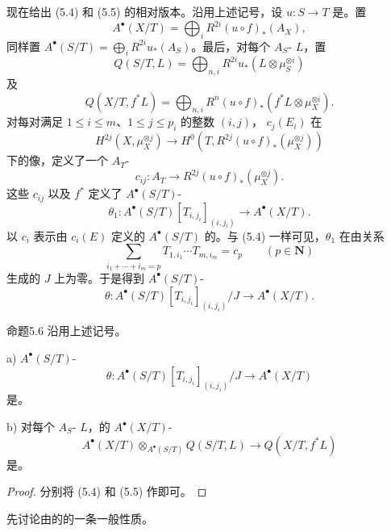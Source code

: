 现在给出 (5.4) 和 (5.5) 的相对版本。沿用上述记号，设 $u:S\to T$ 是。置
\[
 A^\bullet(X/T)=\bigoplus_iR^{2i}(u\circ f)_*(A_X),
\]
同样置 $A^\bullet(S/T)=\bigoplus_iR^{2i}u_*(A_S)$。最后，对每个 $A_S$- $L$，置
\[
 Q(S/T,L)=\bigoplus_{n,i}R^{2i}u_*(L\otimes\mu_S^{\otimes i})
\]
及
\[
 Q(X/T,f^*L)=\bigoplus_{n,i}R^n(u\circ f)_*(f^*L\otimes\mu_X^{\otimes i}).
\]
对每对满足 $1\le i\le m$、$1\le j\le p_i$ 的整数 $(i,j)$， $c_j(E_i)$ 在
\[
 H^{2j}(X,\mu_X^{\otimes j})\longrightarrow
 H^0(T,R^{2j}(u\circ f)_*(\mu_X^{\otimes j}))
\]
下的像，定义了一个 $A_T$-
\[
 c_{ij}:A_T\longrightarrow R^{2j}(u\circ f)_*(\mu_X^{\otimes j}).
\]
这些 $c_{ij}$ 以及 $f^*$ 定义了 $A^\bullet(S/T)$-
\[
 \theta_1:A^\bullet(S/T)[T_{i,j_i}]_{(i,j_i)}\longrightarrow A^\bullet(X/T).
\]
以 $c_i$ 表示由 $c_i(E)$ 定义的 $A^\bullet(S/T)$ 的。与 (5.4) 一样可见，$\theta_1$ 在由关系
\[
 \sum_{i_1+\cdots+i_m=p}T_{1,i_1}\cdots T_{m,i_m}=c_p\qquad(p\in\mathbf N)
\]
生成的 $J$ 上为零。于是得到 $A^\bullet(S/T)$-
\[
 \theta:A^\bullet(S/T)[T_{i,j_i}]_{(i,j_i)}/J\longrightarrow A^\bullet(X/T).
\]
\begin{SGAresult}{命题}{5.6}
沿用上述记号。

a) $A^\bullet(S/T)$-
\[
 \theta:A^\bullet(S/T)[T_{i,j_i}]_{(i,j_i)}/J\longrightarrow A^\bullet(X/T)
\]
是。

b) 对每个 $A_S$- $L$，的 $A^\bullet(X/T)$-
\[
 A^\bullet(X/T)\otimes_{A^\bullet(S/T)}Q(S/T,L)\longrightarrow Q(X/T,f^*L)
\]
是。
\end{SGAresult}
\begin{proof}
分别将 (5.4) 和 (5.5) 作即可。
\end{proof}

先讨论由的的一条一般性质。


